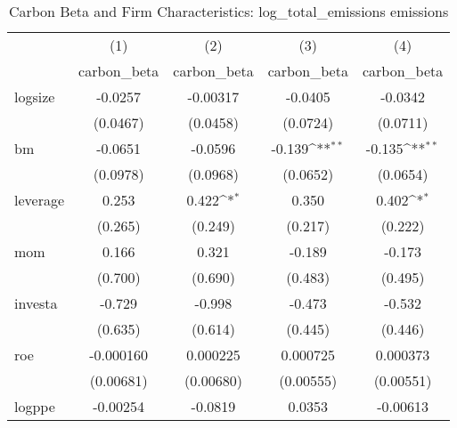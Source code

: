 \begin{table}[htbp]\centering
\def\sym#1{\ifmmode^{#1}\else\(^{#1}\)\fi}
\caption{Carbon Beta and Firm Characteristics: log\_total\_emissions emissions}
\begin{tabular}{l*{4}{c}}
\hline\hline
                    &\multicolumn{1}{c}{(1)}&\multicolumn{1}{c}{(2)}&\multicolumn{1}{c}{(3)}&\multicolumn{1}{c}{(4)}\\
                    &\multicolumn{1}{c}{carbon\_beta}&\multicolumn{1}{c}{carbon\_beta}&\multicolumn{1}{c}{carbon\_beta}&\multicolumn{1}{c}{carbon\_beta}\\
\hline
logsize             &     -0.0257         &    -0.00317         &     -0.0405         &     -0.0342         \\
                    &    (0.0467)         &    (0.0458)         &    (0.0724)         &    (0.0711)         \\
[1em]
bm                  &     -0.0651         &     -0.0596         &      -0.139\sym{**} &      -0.135\sym{**} \\
                    &    (0.0978)         &    (0.0968)         &    (0.0652)         &    (0.0654)         \\
[1em]
leverage            &       0.253         &       0.422\sym{*}  &       0.350         &       0.402\sym{*}  \\
                    &     (0.265)         &     (0.249)         &     (0.217)         &     (0.222)         \\
[1em]
mom                 &       0.166         &       0.321         &      -0.189         &      -0.173         \\
                    &     (0.700)         &     (0.690)         &     (0.483)         &     (0.495)         \\
[1em]
investa             &      -0.729         &      -0.998         &      -0.473         &      -0.532         \\
                    &     (0.635)         &     (0.614)         &     (0.445)         &     (0.446)         \\
[1em]
roe                 &   -0.000160         &    0.000225         &    0.000725         &    0.000373         \\
                    &   (0.00681)         &   (0.00680)         &   (0.00555)         &   (0.00551)         \\
[1em]
logppe              &    -0.00254         &     -0.0819         &      0.0353         &    -0.00613         \\

\end{tabular}
\end{table}
